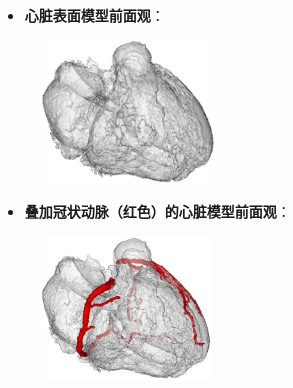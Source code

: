 \begin{frame}
\begin{itemize}
  \item \textbf{心脏表面模型前面观}：
\end{itemize}
\begin{figure}[t]
\centering
\includegraphics[height=1.5in]{../../Figures/gac/heart/heart.eps}
\end{figure}
\end{frame}

\begin{frame}
\begin{itemize}
  \item \textbf{叠加冠状动脉（红色）的心脏模型前面观}：
\end{itemize}
\begin{figure}[t]
\centering
\includegraphics[height=1.5in]{../../Figures/gac/heart/heart_with_ca.eps}
\end{figure}
\end{frame} 

\begin{frame}

\end{frame} 
 